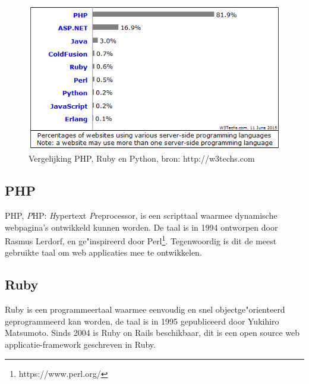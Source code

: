 \documentclass[twoside,openright]{uva-bachelor-thesis}
\begin{document}
			\begin{figure}[!htb]
				\centering
				\includegraphics[scale=0.9]{./img/phpvspython3.png}
				\caption{Vergelijking PHP, Ruby en Python, bron: http://w3techs.com}
				\label{fig:phpvspython3}
			\end{figure} 
			\subsection{PHP}
				PHP, \textit{P}HP: \textit{H}ypertext \textit{P}reprocessor, is een scripttaal waarmee dynamische webpagina's ontwikkeld kunnen worden. De taal is in 1994 ontworpen door Rasmus Lerdorf, en ge"inspireerd door Perl\footnote{https://www.perl.org/}. Tegenwoordig is dit de meest gebruikte taal om web applicaties mee te ontwikkelen. 
			\subsection{Ruby}
				Ruby is een programmeertaal waarmee eenvoudig en snel objectge"orienteerd geprogrammeerd kan worden, de taal is in 1995 gepubliceerd door Yukihiro Matsumoto. Sinds 2004 is Ruby on Rails beschikbaar, dit is een open source web applicatie-framework geschreven in Ruby. 
\end{document}
